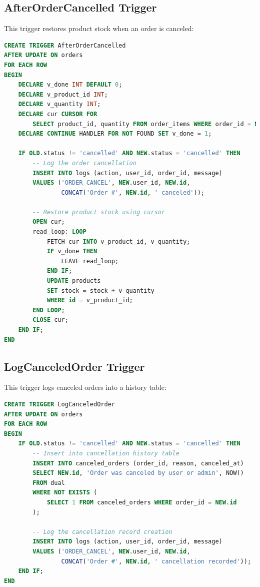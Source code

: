 \documentclass{article}
\begin{document}
\subsection{AfterOrderCancelled Trigger}
This trigger restores product stock when an order is canceled:

\begin{lstlisting}[language=SQL]
CREATE TRIGGER AfterOrderCancelled
AFTER UPDATE ON orders
FOR EACH ROW
BEGIN
    DECLARE v_done INT DEFAULT 0;
    DECLARE v_product_id INT;
    DECLARE v_quantity INT;
    DECLARE cur CURSOR FOR 
        SELECT product_id, quantity FROM order_items WHERE order_id = NEW.id;
    DECLARE CONTINUE HANDLER FOR NOT FOUND SET v_done = 1;

    IF OLD.status != 'cancelled' AND NEW.status = 'cancelled' THEN
        -- Log the order cancellation
        INSERT INTO logs (action, user_id, order_id, message)
        VALUES ('ORDER_CANCEL', NEW.user_id, NEW.id, 
                CONCAT('Order #', NEW.id, ' canceled'));
        
        -- Restore product stock using cursor
        OPEN cur;
        read_loop: LOOP
            FETCH cur INTO v_product_id, v_quantity;
            IF v_done THEN
                LEAVE read_loop;
            END IF;
            UPDATE products
            SET stock = stock + v_quantity
            WHERE id = v_product_id;
        END LOOP;
        CLOSE cur;
    END IF;
END
\end{lstlisting}

\subsection{LogCanceledOrder Trigger}
This trigger logs canceled orders into a history table:

\begin{lstlisting}[language=SQL]
CREATE TRIGGER LogCanceledOrder
AFTER UPDATE ON orders
FOR EACH ROW
BEGIN
    IF OLD.status != 'cancelled' AND NEW.status = 'cancelled' THEN
        -- Insert into cancellation history table
        INSERT INTO canceled_orders (order_id, reason, canceled_at)
        SELECT NEW.id, 'Order was canceled by user or admin', NOW()
        FROM dual
        WHERE NOT EXISTS (
            SELECT 1 FROM canceled_orders WHERE order_id = NEW.id
        );
        
        -- Log the cancellation record creation
        INSERT INTO logs (action, user_id, order_id, message)
        VALUES ('ORDER_CANCEL', NEW.user_id, NEW.id, 
                CONCAT('Order #', NEW.id, ' cancellation recorded'));
    END IF;
END
\end{lstlisting}
\end{document}
